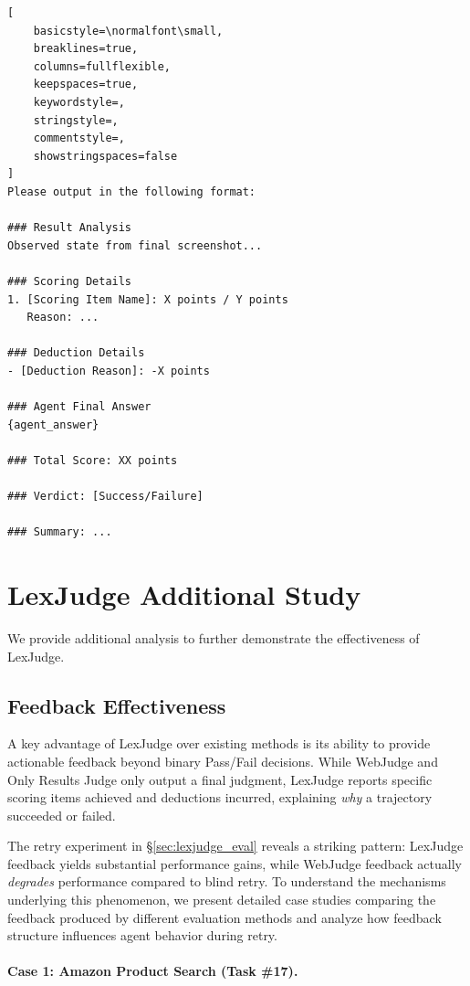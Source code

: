 \begin{tcolorbox}
\begin{lstlisting}[
    basicstyle=\normalfont\small,
    breaklines=true,
    columns=fullflexible,
    keepspaces=true,
    keywordstyle=,
    stringstyle=,
    commentstyle=,
    showstringspaces=false
]
Please output in the following format:

### Result Analysis
Observed state from final screenshot...

### Scoring Details
1. [Scoring Item Name]: X points / Y points
   Reason: ...

### Deduction Details
- [Deduction Reason]: -X points

### Agent Final Answer
{agent_answer}

### Total Score: XX points

### Verdict: [Success/Failure]

### Summary: ...
\end{lstlisting}
\end{tcolorbox}


\section{LexJudge Additional Study}
\label{app:lexjudge_additional}

We provide additional analysis to further demonstrate the effectiveness of LexJudge.

\subsection{Feedback Effectiveness}
\label{app:feedback}

A key advantage of LexJudge over existing methods is its ability to provide actionable feedback beyond binary Pass/Fail decisions. While WebJudge and Only Results Judge only output a final judgment, LexJudge reports specific scoring items achieved and deductions incurred, explaining \textit{why} a trajectory succeeded or failed.


The retry experiment in \S\ref{sec:lexjudge_eval} reveals a striking pattern: LexJudge feedback yields substantial performance gains, while WebJudge feedback actually \textit{degrades} performance compared to blind retry. To understand the mechanisms underlying this phenomenon, we present detailed case studies comparing the feedback produced by different evaluation methods and analyze how feedback structure influences agent behavior during retry.

\paragraph{Case 1: Amazon Product Search (Task \#17).}

